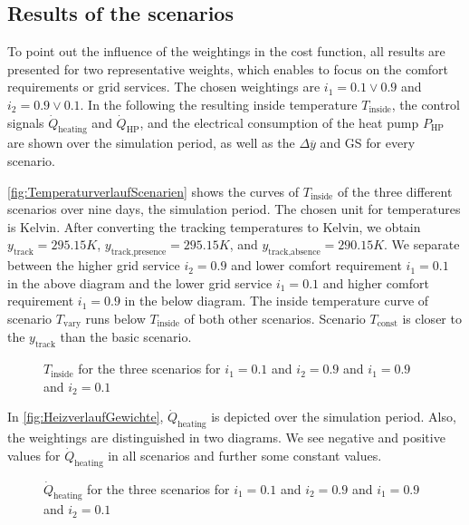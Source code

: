 \subsection{Results of the scenarios}
\label{subsec:Results of the scenarios}
To point out the influence of the weightings in the cost function, all results are presented for two representative weights, which enables to focus on the comfort requirements or grid services. The chosen weightings are $i_\text{1} = 0.1 \vee 0.9$ and $i_\text{2} = 0.9 \vee 0.1$. In the following the resulting inside temperature $T_\text{inside}$, the control signals  $\dot{Q}_\text{heating}$ and $\dot{Q}_\text{HP}$, and the electrical consumption of the heat pump $P_\text{HP}$ are shown over the simulation period, as well as the $\Delta \overline{y}$ and GS for every scenario.\newline

\autoref{fig:TemperaturverlaufScenarien} shows the curves of $T_\text{inside}$ of the three different scenarios over nine days, the simulation period. The chosen unit for temperatures is Kelvin. After converting  the tracking temperatures to Kelvin, we obtain $y_\text{track} = 295.15 K$, $y_\text{track,presence} = 295.15 K$, and $y_\text{track,absence} = 290.15 K$. We separate between the higher grid service $i_\text{2} = 0.9$ and lower comfort requirement $i_\text{1} = 0.1$ in the above diagram and the lower grid service $i_\text{1} = 0.1$ and higher comfort requirement $i_\text{1} = 0.9$ in the below diagram.\newline 
The inside temperature curve of scenario $T_\text{vary}$ runs below $T_\text{inside}$ of both other scenarios. Scenario $T_\text{const}$ is closer to the $y_\text{track}$ than the basic scenario. 
    \begin{figure}[H]
           \centering
        \def\svgwidth{1\textwidth}
        
        \caption{$T_\text{inside}$ for the three scenarios for $i_\text{1} = 0.1$ and $i_\text{2} = 0.9$ and $i_\text{1} = 0.9$ and $i_\text{2} = 0.1$}
         \label{fig:TemperaturverlaufScenarien}
    \end{figure}
 
In \autoref{fig:HeizverlaufGewichte}, $\dot{Q}_\text{heating}$ is depicted over the simulation period. Also, the weightings are distinguished in two diagrams. We see negative and positive values for $\dot{Q}_\text{heating}$ in all scenarios and further some constant values.
     \begin{figure}[H]
           \centering
        \def\svgwidth{1.05\textwidth}
        
        \caption{$\dot{Q}_\text{heating}$ for the three scenarios for $i_\text{1} = 0.1$ and $i_\text{2} = 0.9$ and $i_\text{1} = 0.9$ and $i_\text{2} = 0.1$}
         \label{fig:HeizverlaufGewichte}
    \end{figure}
    
